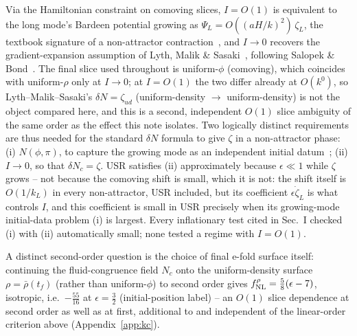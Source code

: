 \documentclass[aps,prd,twocolumn,superscriptaddress,showpacs,preprintnumbers,nofootinbib,longbibliography,floatfix]{revtex4-2}
\newcommand{\eps}{\epsilon}
\begin{document}
Via the Hamiltonian constraint on comoving slices, $I=O(1)$ is equivalent to the long
mode's Bardeen potential growing as $\Psi_L=O((aH/k)^2)\,\zeta_L$, the textbook signature
of a non-attractor contraction~\cite{Wands1999,Finelli2002}, and $I\to0$ recovers the
gradient-expansion assumption of Lyth, Malik \& Sasaki~\cite{Lyth2005}, following Salopek \&
Bond~\cite{Salopek1990}. The final slice used throughout is uniform-$\phi$ (comoving), which
coincides with uniform-$\rho$ only at $I\to0$; at $I=O(1)$ the two differ already at
$O(k^0)$, so Lyth--Malik--Sasaki's $\delta N=\zeta_{ud}$ (uniform-density $\to$ uniform-density)
is not the object compared here, and this is a second, independent $O(1)$ slice ambiguity of
the same order as the effect this note isolates. Two logically distinct requirements are thus needed for the
standard $\delta N$ formula to give $\zeta$ in a non-attractor phase: (i) $N(\phi,\pi)$, to
capture the growing mode as an independent initial datum~\cite{Namjoo2013}; (ii) $I\to0$,
so that $\delta N_c=\zeta$. USR satisfies (ii) approximately because $\eps\ll1$ while
$\zeta$ grows -- not because the comoving shift is small, which it is not: the shift itself
is $O(1/k_L)$ in every non-attractor, USR included, but its coefficient $\eps\dot\zeta_L$ is
what controls $I$, and this coefficient is small in USR precisely when its growing-mode
initial-data problem (i) is largest. Every inflationary test cited in Sec.~I checked (i)
with (ii) automatically small; none tested a regime with $I=O(1)$.

A distinct second-order question is the choice of final e-fold surface itself: continuing
the fluid-congruence field $N_c$ onto the uniform-density surface $\rho=\bar\rho(t_f)$
(rather than uniform-$\phi$) to second order gives $f^{\rho}_{\rm NL}=\tfrac58(\eps-7)$,
isotropic, i.e.\ $-\tfrac{55}{16}$ at $\eps=\tfrac32$ (initial-position label) -- an $O(1)$ slice
dependence at second order as well as at first, additional to and independent of the
linear-order criterion above (Appendix~\ref{app:kc}).
\end{document}
